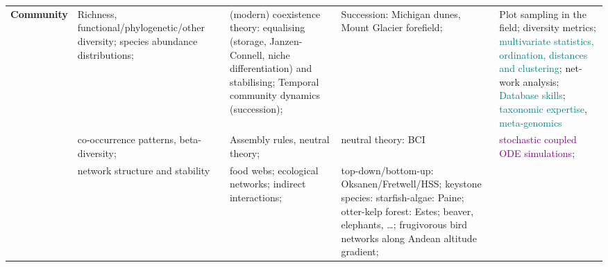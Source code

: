 \documentclass[english,11pt,a4paper, landscape]{article}
\begin{document}
\begin{tabularx}{\textwidth}{p{2cm}>{\raggedright\arraybackslash}X>{\raggedright\arraybackslash}X>{\raggedright\arraybackslash}X|>{\raggedright\arraybackslash}X}
\textbf{Community} & Richness, functional/phylogenetic/other diversity; species abund­ance distribu­tions; & (modern) coexistence theory: equalising (storage, Janzen-Connell, niche differentiation) and stabilising;  Temporal community dynamics (succession); & Succession: Michigan dunes, Mount Glacier forefield; & Plot sampling in the field;
diversity metrics;
\textcolor{teal}{multivariate statistics, ordination, distances and clustering}; 
net­work analysis; \textcolor{teal}{Database skills}; \textcolor{teal}{taxonomic expertise}, \textcolor{teal}{meta-genomics}	\\
	& co-occur­rence patterns, beta-diversity; & Assembly rules, neutral the­ory; & neutral theory: BCI & \textcolor{purple}{stochastic coupled ODE simulations}; 
	\\
	& network structure and stability & food webs; ecological networks; indirect interactions; & top-down/bottom-up: Oksanen/Fretwell/HSS; key­stone species: starfish-algae: Paine; otter-kelp forest: Estes; 
	beaver, elephants, …; frugivorous bird networks along Andean altitude gradient;	& \\ \hline
			

\end{tabularx}
\end{document}
